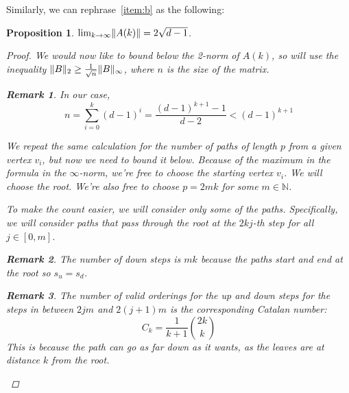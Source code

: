 \documentclass{amsart}
\theoremstyle{plain}
\newtheorem*{proposition}{\textbf{Proposition}}
\theoremstyle{definition}
\newtheorem*{rk}{\textbf{Remark}}
\newcommand{\N}{\mathbb{N}}
\DeclarePairedDelimiter{\norm}{\lVert}{\rVert}
\begin{document}
    Similarly, we can rephrase~\ref{item:b} as the following:
    \begin{proposition}
        $\lim_{k \to \infty} \norm{A(k)} = 2 \sqrt{d - 1}$.

        \begin{proof}
            We would now like to bound \emph{below} the 2-norm of $A(k)$, so will use the inequality
            $\norm{B}_2 \geq \frac{1}{\sqrt{n}} \norm{B}_\infty$, where $n$ is the size of the matrix.
            \begin{rk}
                In our case,
                \begin{equation*}
                    n = \sum_{i=0}^{k} (d-1)^i = \frac{(d-1)^{k+1} - 1}{d-2} < (d-1)^{k+1}
                \end{equation*}
            \end{rk}

            We repeat the same calculation for the number of paths of length $p$ from a given vertex $v_i$,
            but now we need to bound it below.
            Because of the maximum in the formula in the $\infty$-norm,
            we're free to choose the starting vertex $v_i$.
            We will choose the root.
            We're also free to choose $p = 2mk$ for some $m \in \N$.

            To make the count easier, we will consider only some of the paths.
            Specifically, we will consider paths that pass through the root
            at the $2kj$-th step for all $j \in [0, m]$.

            \begin{rk}
                The number of \emph{down} steps is $mk$ because the paths start and end at the root so $s_u = s_d$.
            \end{rk}

            \begin{rk}
                The number of valid orderings for the \emph{up} and \emph{down} steps for the steps in between
                $2jm$ and $2(j+1)m$ is
                the corresponding \emph{Catalan number}:
                \begin{equation*}
                    C_{k} = \frac{1}{k+1} \binom{2k}{k}
                \end{equation*}
                This is because the path can go as far down as it wants, as the leaves are at distance $k$
                from the root.
            \end{rk}


\end{proof}
\end{proposition}
\end{document}
